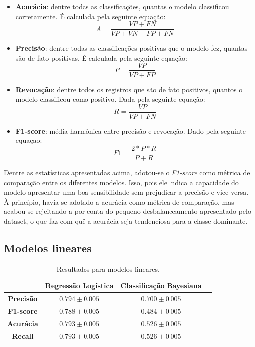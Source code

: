 \documentclass{homework}
\begin{document}
\begin{itemize}
    \item \textbf{Acurácia}: dentre todas as classificações, quantas o modelo classificou corretamente. É calculada pela
    seguinte equação:
    \begin{equation}
        A = \frac{VP + FN}{VP + VN + FP + FN}
    \end{equation}
    \item \textbf{Precisão}: dentre todas as classificações positivas que o modelo fez, quantas são de fato positivas. É
    calculada pela seguinte equação:
    \begin{equation}
        P = \frac{VP}{VP + FP}
    \end{equation}
    \item \textbf{Revocação}: dentre todos os registros que são de fato positivos, quantos o modelo classificou como
    positivo. Dada pela seguinte equação:
    \begin{equation}
        R = \frac{VP}{VP + FN}
    \end{equation}
    \item \textbf{F1-score}: média harmônica entre precisão e revocação. Dado pela seguinte equação:
    \begin{equation}
        F1 = \frac{2*P*R}{P+R}
    \end{equation}
\end{itemize}

Dentre as estatísticas apresentadas acima, adotou-se o \textit{F1-score} como métrica de comparação entre os diferentes
modelos. Isso, pois ele indica a capacidade do modelo apresentar uma boa sensibilidade sem prejudicar a precisão e
vice-versa. À princípio, havia-se adotado a acurácia como métrica de comparação, mas acabou-se rejeitando-a por conta do
pequeno desbalanceamento apresentado pelo dataset, o que faz com quê a acurácia seja tendenciosa para a classe dominante.

\subsection{Modelos lineares}

\begin{table}[h!]
    \centering
    \begin{tabular}{|c|c|c|c|}
        \hline
            & \textbf{Regressão Logística} & \textbf{Classificação Bayesiana} \\
        \hline
        \textbf{Precisão} & $0.794 \pm 0.005$ & $0.700 \pm 0.005$ \\
        \hline
        \textbf{F1-score} & $0.788 \pm 0.005$ & $0.484 \pm 0.005$ \\
        \hline
        \textbf{Acurácia} & $0.793 \pm 0.005$ & $0.526 \pm 0.005$ \\
        \hline
        \textbf{Recall} & $0.793 \pm 0.005$ & $0.526 \pm 0.005$ \\
        \hline
    \end{tabular}
    \caption{Resultados para modelos lineares.}
    \label{linear_results}
\end{table}
\end{document}
